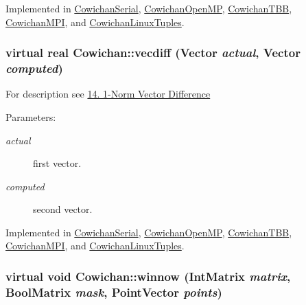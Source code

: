Implemented in \hyperlink{class_cowichan_serial_7c0f93b2099ce919f91b5d953ff76511}{CowichanSerial}, \hyperlink{class_cowichan_open_m_p_e72c4c0a162f30eac37333bd28db97bc}{CowichanOpenMP}, \hyperlink{class_cowichan_t_b_b_3306d21f0b3d12cc2e3b050b99812a27}{CowichanTBB}, \hyperlink{class_cowichan_m_p_i_49ff96b091a61e9cfd9aad8824e7fbbd}{CowichanMPI}, and \hyperlink{class_cowichan_linux_tuples_b8cf055ec3d42a1ccde6d818c5a43a74}{CowichanLinuxTuples}.\hypertarget{class_cowichan_775d72b5e7d122f9f32555352278250e}{
\subsubsection[{vecdiff}]{\setlength{\rightskip}{0pt plus 5cm}virtual {\bf real} Cowichan::vecdiff ({\bf Vector} {\em actual}, \/  {\bf Vector} {\em computed})}}
\label{class_cowichan_775d72b5e7d122f9f32555352278250e}


For description see \hyperlink{index_vecdiff_sec}{14. 1-Norm Vector Difference} \begin{Desc}
\item[Parameters:]
\begin{description}
\item[{\em actual}]first vector. \item[{\em computed}]second vector. \end{description}
\end{Desc}


Implemented in \hyperlink{class_cowichan_serial_34b75a2084051b3677071bb3c334d1f4}{CowichanSerial}, \hyperlink{class_cowichan_open_m_p_92aa23ed47da0a5a3b43416ab08199b3}{CowichanOpenMP}, \hyperlink{class_cowichan_t_b_b_28c976743df231fd183e4db9306050b1}{CowichanTBB}, \hyperlink{class_cowichan_m_p_i_c5470a2876efecf843b19c37c21ecf19}{CowichanMPI}, and \hyperlink{class_cowichan_linux_tuples_213185666ea7dd0c9abc59899b454086}{CowichanLinuxTuples}.\hypertarget{class_cowichan_13d60e06ced3b5da79d62c133ce82337}{
\subsubsection[{winnow}]{\setlength{\rightskip}{0pt plus 5cm}virtual void Cowichan::winnow ({\bf IntMatrix} {\em matrix}, \/  {\bf BoolMatrix} {\em mask}, \/  {\bf PointVector} {\em points})}}
\label{class_cowichan_13d60e06ced3b5da79d62c133ce82337}


